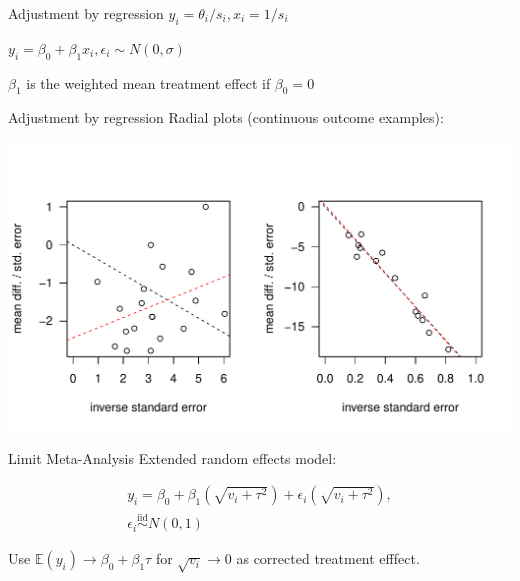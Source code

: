 \documentclass[english]{beamer}\usepackage[]{graphicx}\usepackage[]{color}
\makeatletter
\def\maxwidth{ %
  \ifdim\Gin@nat@width>\linewidth
    \linewidth
  \else
    \Gin@nat@width
  \fi
}
\newenvironment{knitrout}{}{} %
\makeatother
\begin{document}
\begin{frame}{Adjustment by regression}
$y_i = \theta_i/s_i, x_i = 1/s_i$

$y_i = \beta_0 + \beta_1 x_i, \epsilon_i \sim N(0, \sigma)$

$\beta_{1}$ is the weighted mean treatment effect if $\beta_{0} = 0$
\end{frame}


\begin{frame}{Adjustment by regression}
Radial plots (continuous outcome examples):

\vspace{-1.1cm}

\begin{knitrout}
\color{fgcolor}
\includegraphics[width=\maxwidth]{figure/unnamed-chunk-10-1} 

\end{knitrout}
\end{frame}



\begin{frame}[fragile]{Limit Meta-Analysis}
Extended random effects model:

\vspace{-4mm}
\begin{align}
y_{i} = \beta_{0} + \beta_{1}(\sqrt{v_{i} + \tau^2}) + \epsilon_{i}(\sqrt{v_{i} + \tau^2}), \nonumber \\
\epsilon_{i} \stackrel{\textrm{iid}}{\sim} N(0,1) \nonumber
\end{align}

Use $\mathbb{E}(y_{i}) \rightarrow \beta_{0} + \beta_{1}\tau$ for $\sqrt{v_{i}} \rightarrow 0$
as corrected treatment efffect.
\end{frame}
\end{document}
